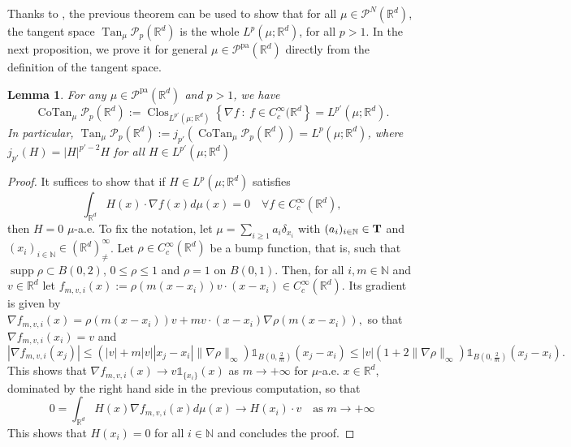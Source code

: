 \documentclass[10pt,leqno]{amsart}
\numberwithin{equation}{section}
\newtheorem{lemma}[teorema]{Lemma}
\newcommand{\R}{\mathbb{R}}
\newcommand{\N}{\mathbb{N}}
\newcommand{\PP}{\mathcal{P}}
\newcommand{\PPpa}{\PP^{\operatorname{pa}}}
\newcommand{\PPN}{\PP^N}
\begin{document}
Thanks to \cite[Proposition 8.4.5]{ambrosio2005gradient}, the previous theorem can be used to show that for all $\mu\in \PPN(\R^d)$, the tangent space $\operatorname{Tan}_\mu \PP_p(\R^d)$ is the whole $L^p(\mu;\R^d)$, for all $p>1$.
In the next proposition, we prove it for general $\mu\in \PPpa(\R^d)$ directly from the definition of the tangent space.

\begin{lemma}\label{lemma: tangent}
    For any $\mu\in \PPpa(\R^d)$ and $p>1$, we have 
    \[\operatorname{CoTan}_\mu \PP_p(\R^d) := \operatorname{Clos}_{L^{p'}(\mu;\R^d)} \left\{ \nabla f \ : \ f \in C_c^{\infty}(\R^d \right\} = L^{p'}(\mu;\R^d).\]
    In particular, $\operatorname{Tan}_\mu \PP_p(\R^d):= j_{p'}(\operatorname{CoTan}_\mu \PP_p(\R^d)) = L^p(\mu;\R^d)$, where $j_{p'}(H) = |H|^{p'-2}H$ for all $H\in L^{p'}(\mu;\R^d)$
\end{lemma}

\begin{proof}
    It suffices to show that if $H\in L^p(\mu;\R^d)$ satisfies
    \begin{equation}\label{eq:1}
        \int_{\R^d} H(x)\cdot \nabla f(x) d\mu(x) = 0 \quad \forall f \in C_c^\infty(\R^d),
    \end{equation}
    then $H = 0$ $\mu$-a.e. To fix the notation, let $\mu = \sum_{i\geq1} a_i \delta_{x_i}$ with $(a_i)_{i\in \N} \in \bold{T}$ and $(x_i)_{i\in \N} \in (\R^d)^{\infty}_{\neq}$. Let $\rho\in C_c^\infty(\R^d)$ be a bump function, that is, such that $\operatorname{supp}\rho \subset B(0,2)$, $0\leq\rho \leq1$ and $\rho = 1$ on $B(0,1)$. Then, for all $i,m\in \N$ and $v\in \R^d$ let 
    \(f_{m,v,i}(x):= \rho(m(x-x_i)) v \cdot (x-x_i) \in C_c^\infty(\R^d).\)
    Its gradient is given by 
    \(\nabla f_{m,v,i}(x) = \rho(m(x-x_i))v + mv \cdot(x-x_i) \nabla \rho(m(x-x_i)),\)
    so that 
    $\nabla f_{m,v,i}(x_i) = v$ and
    \[|\nabla f_{m,v,i}(x_j)| \leq (|v| + m|v||x_j-x_i|\|\nabla\rho\|_\infty)\mathds{1}_{B(0,\frac2m)}(x_j-x_i) \leq |v|(1+ 2\|\nabla\rho\|_\infty)\mathds{1}_{B(0,\frac2m)}(x_j-x_i). \]
    This shows that $\nabla f_{m,v,i}(x) \to v \mathds{1}_{\{x_i\}}(x)$ as $m\to +\infty$ for $\mu$-a.e. $x\in \R^d$, dominated by the right hand side in the previous computation, so that 
    \[0 = \int_{\R^d} H(x)\nabla f_{m,v,i}(x) d\mu(x)\longrightarrow H(x_i)\cdot v \quad \text{as }m\to +\infty\]
    This shows that $H(x_i) = 0$ for all $i\in \N$ and concludes the proof.
\end{proof}
\end{document}
